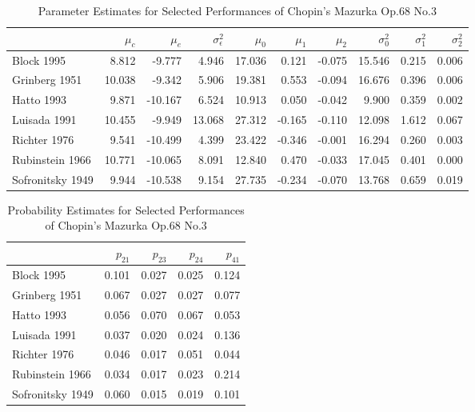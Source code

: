 \documentclass[12pt]{article}
\begin{document}
\begin{table}

\caption{\label{tab:table3}Parameter Estimates for Selected Performances of Chopin's Mazurka Op.68 No.3\label{tab:parameterestimatesrichter}}
\centering
\begin{tabular}[t]{lrrrrrrrrr}
\toprule
  & $\mu_c$ & $\mu_e$ & $\sigma^2_\epsilon$ & $\mu_0$ & $\mu_1$ & $\mu_2$ & $\sigma^2_0$ & $\sigma^2_1$ & $\sigma^2_2$\\
\midrule
\rowcolor{gray!6}  Block 1995 & 8.812 & -9.777 & 4.946 & 17.036 & 0.121 & -0.075 & 15.546 & 0.215 & 0.006\\
Grinberg 1951 & 10.038 & -9.342 & 5.906 & 19.381 & 0.553 & -0.094 & 16.676 & 0.396 & 0.006\\
\rowcolor{gray!6}  Hatto 1993 & 9.871 & -10.167 & 6.524 & 10.913 & 0.050 & -0.042 & 9.900 & 0.359 & 0.002\\
Luisada 1991 & 10.455 & -9.949 & 13.068 & 27.312 & -0.165 & -0.110 & 12.098 & 1.612 & 0.067\\
\rowcolor{gray!6}  Richter 1976 & 9.541 & -10.499 & 4.399 & 23.422 & -0.346 & -0.001 & 16.294 & 0.260 & 0.003\\
\addlinespace
Rubinstein 1966 & 10.771 & -10.065 & 8.091 & 12.840 & 0.470 & -0.033 & 17.045 & 0.401 & 0.000\\
\rowcolor{gray!6}  Sofronitsky 1949 & 9.944 & -10.538 & 9.154 & 27.735 & -0.234 & -0.070 & 13.768 & 0.659 & 0.019\\
\bottomrule
\end{tabular}
\end{table}

\begin{table}

\caption{\label{tab:table3ext}Probability Estimates for Selected Performances of Chopin's Mazurka Op.68 No.3\label{tab:probestimatesrichter}}
\centering
\begin{tabular}[t]{lrrrr}
\toprule
  & $p_{21}$ & $p_{23}$ & $p_{24}$ & $p_{41}$\\
\midrule
\rowcolor{gray!6}  Block 1995 & 0.101 & 0.027 & 0.025 & 0.124\\
Grinberg 1951 & 0.067 & 0.027 & 0.027 & 0.077\\
\rowcolor{gray!6}  Hatto 1993 & 0.056 & 0.070 & 0.067 & 0.053\\
Luisada 1991 & 0.037 & 0.020 & 0.024 & 0.136\\
\rowcolor{gray!6}  Richter 1976 & 0.046 & 0.017 & 0.051 & 0.044\\
\addlinespace
Rubinstein 1966 & 0.034 & 0.017 & 0.023 & 0.214\\
\rowcolor{gray!6}  Sofronitsky 1949 & 0.060 & 0.015 & 0.019 & 0.101\\
\bottomrule
\end{tabular}
\end{table}
\end{document}
